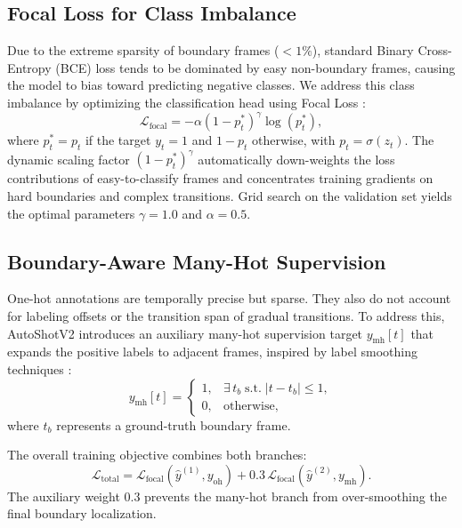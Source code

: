 \subsection{Focal Loss for Class Imbalance}

Due to the extreme sparsity of boundary frames ($<1\%$), standard Binary Cross-Entropy (BCE) loss tends to be dominated by easy non-boundary frames, causing the model to bias toward predicting negative classes. We address this class imbalance by optimizing the classification head using Focal Loss \cite{lin2017focal}:
\begin{equation}
    \mathcal{L}_{\mathrm{focal}} = -\alpha(1-p_t^{*})^{\gamma}\log(p_t^{*}),
\end{equation}
where $p_t^* = p_t$ if the target $y_t=1$ and $1 - p_t$ otherwise, with $p_t = \sigma(z_t)$. The dynamic scaling factor $(1-p_t^*)^{\gamma}$ automatically down-weights the loss contributions of easy-to-classify frames and concentrates training gradients on hard boundaries and complex transitions. Grid search on the validation set yields the optimal parameters $\gamma=1.0$ and $\alpha=0.5$.

\subsection{Boundary-Aware Many-Hot Supervision}

One-hot annotations are temporally precise but sparse. They also do not account for labeling offsets or the transition span of gradual transitions. To address this, AutoShotV2 introduces an auxiliary many-hot supervision target $y_{\mathrm{mh}}[t]$ that expands the positive labels to adjacent frames, inspired by label smoothing techniques \cite{Muller2019LabelSmoothing}:
\begin{equation}
    y_{\mathrm{mh}}[t] =
    \begin{cases}
        1, & \exists\, t_b \;\mathrm{s.t.}\; |t-t_b|\leq1,\\
        0, & \mathrm{otherwise},
    \end{cases}
\end{equation}
where $t_b$ represents a ground-truth boundary frame.

The overall training objective combines both branches:
\begin{equation}
    \mathcal{L}_{\mathrm{total}} =
    \mathcal{L}_{\mathrm{focal}}(\hat{y}^{(1)},y_{\mathrm{oh}})
    +0.3\,\mathcal{L}_{\mathrm{focal}}(\hat{y}^{(2)},y_{\mathrm{mh}}).
\end{equation}
The auxiliary weight $0.3$ prevents the many-hot branch from over-smoothing the final boundary localization.

